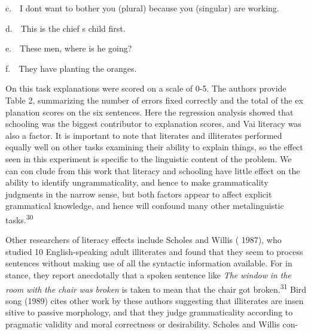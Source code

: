\begin{styleTextbody}
c.\ \ I don{\textquotesingle}t want to bother you (plural) because you (singular) are working.
\end{styleTextbody}


\begin{styleTextbody}
d.\ \ This is the chief {\textquotesingle}s child first.
\end{styleTextbody}


\begin{styleTextbody}
e.\ \ These men, where is he going?
\end{styleTextbody}


\begin{styleTextbody}
f.\ \ They have planting the oranges.
\end{styleTextbody}


\begin{styleTextbody}
On this task explanations were scored on a scale of 0-5. The authors provide Table 2, summarizing the number of errors fixed correctly and the total of the ex\- planation scores on the six sentences. Here the regression analysis showed that schooling was the biggest contributor to explanation scores, and Vai literacy was also a factor. It is important to note that literates and illiterates performed equally well on other tasks examining their ability to explain things, so the effect seen in this experiment is specific to the linguistic content of the problem. We can con\- clude from this work that literacy and schooling have little effect on the ability to identify ungrammaticality, and hence to make grammaticality judgments in the narrow sense, but both factors appear to affect explicit grammatical knowledge, and hence will confound many other metalinguistic tasks.\textsuperscript{30}
\end{styleTextbody}


\begin{styleTextbody}
Other researchers of literacy effects include Scholes and Willis ( 1987), who studied 10 English-speaking adult illiterates and found that they seem to process sentences without making use of all the syntactic information available. For in\- stance, they report anecdotally that a spoken sentence like \textit{The}\textit{ }\textit{window}\textit{ }\textit{in}\textit{ }\textit{the}\textit{ }\textit{room}\textit{ }\textit{with}\textit{ }\textit{the}\textit{ }\textit{chair}\textit{ }\textit{was}\textit{ }\textit{broken}\textit{ }is taken to mean that the chair got broken.\textsuperscript{31}\textsuperscript{ }Bird\- song (1989) cites other work by these authors suggesting that illiterates are insen\- sitive to passive morphology, and that they judge grammaticality according to pragmatic validity and moral correctness or desirability. Scholes and Willis con-
\end{styleTextbody}


